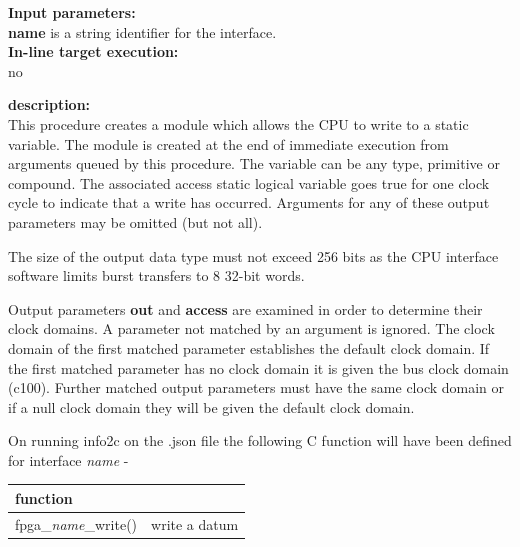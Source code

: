            {\bf Input parameters:} \\
            {\bf name} is a string identifier for the interface.\\
        
            {\bf In-line target execution:} \\
            no

            {\bf description:} \\
            This procedure creates a module which allows the CPU to write to a
            static variable. The module is created at the end of immediate
            execution from arguments queued by this procedure. The variable can
            be any type, primitive or compound. The associated access static
            logical variable goes true for one clock cycle to indicate that a
            write has occurred. Arguments for any of these output parameters may
            be omitted (but not all).

            The size of the output data type must not exceed 256 bits as the CPU
            interface software limits burst transfers to 8 32-bit words.

            Output parameters {\bf out} and {\bf access} are examined in order
            to determine their clock domains. A parameter not matched by an
            argument is ignored. The clock domain of the first matched parameter
            establishes the default clock domain. If the first matched parameter
            has no clock domain it is given the bus clock domain (c100). Further
            matched output parameters must have the same clock domain or if a
            null clock domain they will be given the default clock domain.

            On running info2c on the .json file the following C function will
            have been defined for interface {\em name} -
            
            \begin{tabular}{| l | l |}
            \hline
            function                   &               \\ \hline \hline
            fpga\_{\em name}\_write()  & write a datum  \\ \hline
            \end{tabular}
            
